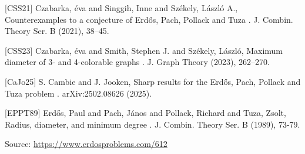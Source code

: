\documentclass{article}
\begin{document}
[CSS21] Czabarka, \'{e}va and Singgih, Inne and Sz\'{e}kely, L\'{a}szl\'{o}{} A., Counterexamples to a conjecture of {E}rd\H{o}s, {P}ach, {P}ollack and Tuza . J. Combin. Theory Ser. B (2021), 38--45.

[CSS23] Czabarka, \'{e}va and Smith, Stephen J. and Sz\'{e}kely, L\'{a}szl\'{o}, Maximum diameter of 3- and 4-colorable graphs . J. Graph Theory (2023), 262--270.

[CaJo25] S. Cambie and J. Jooken, Sharp results for the Erd\H{o}s, Pach, Pollack and Tuza problem . arXiv:2502.08626 (2025).

[EPPT89] Erd\H{o}s, Paul and Pach, J\'{a}nos and Pollack, Richard and Tuza, Zsolt, Radius, diameter, and minimum degree . J. Combin. Theory Ser. B (1989), 73-79.


\bigskip
\noindent\small{Source: \url{https://www.erdosproblems.com/612}}
\end{document}

